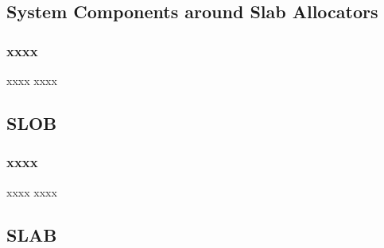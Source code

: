 \subsection{System Components around Slab Allocators} %

\begin{frame}[plain,t]
    
    \frametitle{xxxx}
    
    
    \begin{block}{xxxx}
        xxxx

    \end{block} 
    
    
    \begin{figure}
        \centering
    \end{figure}
    
\end{frame}

\subsection{SLOB} %

\begin{frame}[plain,t]
    
    \frametitle{xxxx}
    
    
    \begin{block}{xxxx}
        xxxx

    \end{block} 
    
    
    \begin{figure}
        \centering
    \end{figure}
    
\end{frame}
\subsection{SLAB} %

